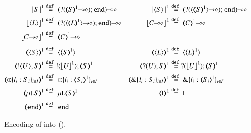 \begin{figure}[t!]
\begin{align*}
	\vtmap{{S}}{1} & \defeq	\lhot{(\btinp{\lhot{\tmap{S}{1}}} \tinact)}
	&  
	\vtmap{\chtype{S}}{1} & \defeq	\lhot{(\btinp{\shot{\chtype{\tmap{S}{1}}}} \tinact)}
	\\
	\vtmap{\chtype{L}}{1} & \defeq	\lhot{(\btinp{\shot{\chtype{\tmap{L}{1}}}} \tinact)}
	&  
	\vtmap{\lhot{C}}{1} & \defeq \lhot{\tmap{C}{1}}
	\\
	\vtmap{\shot{C}}{1} & \defeq\shot{\tmap{C}{1}}
	\\[1mm]
	\tmap{\chtype{S}}{1} & \defeq	\chtype{\tmap{S}{1}} 
	&
	\tmap{\chtype{L}}{1} & \defeq\chtype{\tmap{L}{1}}
	\\
	\tmap{\btout{U} S}{1} & \defeq \btout{{\vtmap{U}{1}}} \tmap{S}{1}
	&
	\tmap{\btinp{U} S}{1} & \defeq\btinp{{\vtmap{U}{1}}} \tmap{S}{1}
	\\
	\tmap{\btsel{l_i: S_i}_{i \in I}}{1} & \defeq \btsel{l_i: \tmap{S_i}{1}}_{i \in I}
	&
	\tmap{\btbra{l_i: S_i}_{i \in I}}{1} & \defeq \btbra{l_i: \tmap{S_i}{1}}_{i \in I}
	\\
	\tmap{\trec{t}{S}}{1}  & \defeq \trec{t}{\tmap{S}{1}}
		&
		\tmap{\vart{t}}{1} & \defeq \vart{t} 
			\\
		\tmap{\tinact}{1}  & \defeq  \tinact
\end{align*}
%
\caption{\label{f:enc:hopi_to_ho}Encoding of \HOp into \HO ().}
\end{figure}

